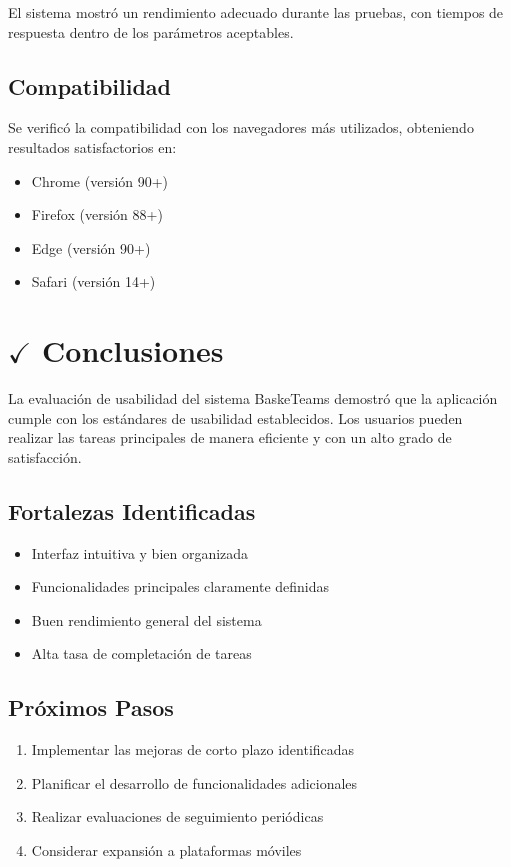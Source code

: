 \documentclass[12pt,a4paper]{article}
\begin{document}
El sistema mostró un rendimiento adecuado durante las pruebas, con tiempos de respuesta dentro de los parámetros aceptables.

\subsection{Compatibilidad}

Se verificó la compatibilidad con los navegadores más utilizados, obteniendo resultados satisfactorios en:

\begin{itemize}
    \item[$\bullet$] Chrome (versión 90+)
    \item[$\bullet$] Firefox (versión 88+)
    \item[$\bullet$] Edge (versión 90+)
    \item[$\bullet$] Safari (versión 14+)
\end{itemize}

\section{$\checkmark$ Conclusiones}

La evaluación de usabilidad del sistema BaskeTeams demostró que la aplicación cumple con los estándares de usabilidad establecidos. Los usuarios pueden realizar las tareas principales de manera eficiente y con un alto grado de satisfacción.

\subsection{Fortalezas Identificadas}

\begin{itemize}
    \item Interfaz intuitiva y bien organizada
    \item Funcionalidades principales claramente definidas
    \item Buen rendimiento general del sistema
    \item Alta tasa de completación de tareas
\end{itemize}

\subsection{Próximos Pasos}

\begin{enumerate}
    \item Implementar las mejoras de corto plazo identificadas
    \item Planificar el desarrollo de funcionalidades adicionales
    \item Realizar evaluaciones de seguimiento periódicas
    \item Considerar expansión a plataformas móviles
\end{enumerate}
\end{document}
